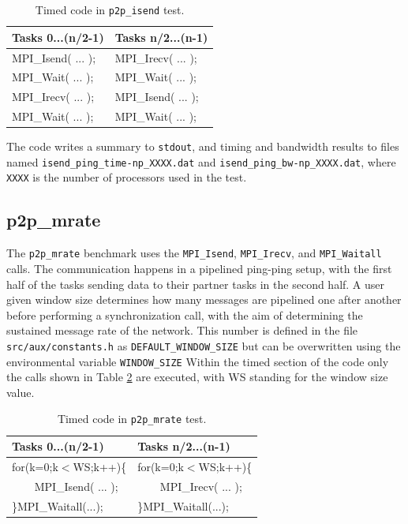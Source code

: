 \documentclass[10pt,a4paper]{report}
\begin{document}
\begin{table}[ht]
\centering
\caption{Timed code in \texttt{p2p\_isend} test.}
\label{tab:ping}
\begin{tabular}{|l|l|}
\hline
\bf{Tasks 0...(n/2-1)}	& \bf{Tasks n/2...(n-1)}\\\hline
MPI\_Isend( ... );      & MPI\_Irecv( ... );\\
MPI\_Wait( ... );       & MPI\_Wait( ... );\\
MPI\_Irecv( ... );      & MPI\_Isend( ... );\\
MPI\_Wait( ... );       & MPI\_Wait( ... );\\\hline
\end{tabular}
\end{table}

The code writes a summary to \verb+stdout+, and timing and bandwidth results to files named \verb+isend_ping_time-np_XXXX.dat+ and \verb+isend_ping_bw-np_XXXX.dat+, where \verb+XXXX+ is the number of processors used in the test.

\FloatBarrier

\subsection{p2p\_mrate}
The \verb+p2p_mrate+ benchmark uses the \verb+MPI_Isend+, \verb+MPI_Irecv+, and \verb+MPI_Waitall+ calls. The communication happens in a pipelined ping-ping setup, with the first half of the tasks sending data to their partner tasks in the second half. A user given window size determines how many messages are pipelined one after another before performing a synchronization call, with the aim of determining the sustained message rate of the network. This number is defined in the file \verb+src/aux/constants.h+ as \verb+DEFAULT_WINDOW_SIZE+ but can be overwritten using the environmental variable \verb+WINDOW_SIZE+  Within the timed section of the code only the calls shown in Table \ref{tab:mrate} are executed, with WS standing for the window size value.

\begin{table}[ht]
\centering
\caption{Timed code in \texttt{p2p\_mrate} test.}
\label{tab:mrate}
\begin{tabular}{|l|l|}
\hline
\bf{Tasks 0...(n/2-1)}	& \bf{Tasks n/2...(n-1)}\\\hline
for(k=0;k$<$WS;k++)\{     & for(k=0;k$<$WS;k++)\{ \\
\verb+    +MPI\_Isend( ... );      & \verb+    +MPI\_Irecv( ... );\\
\}MPI\_Waitall(...);    & \}MPI\_Waitall(...);\\\hline
\end{tabular}
\end{table}
\end{document}
